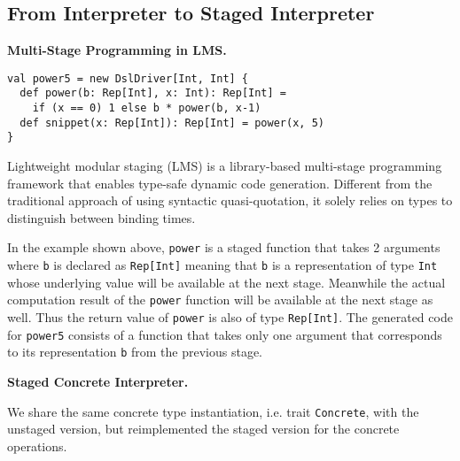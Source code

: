 \subsection{From Interpreter to Staged Interpreter} \label{stagedinterp}

\textbf{Multi-Stage Programming in LMS.}

\begin{lstlisting}
val power5 = new DslDriver[Int, Int] {
  def power(b: Rep[Int], x: Int): Rep[Int] =
    if (x == 0) 1 else b * power(b, x-1)
  def snippet(x: Rep[Int]): Rep[Int] = power(x, 5)
}
\end{lstlisting}

Lightweight modular staging (LMS)  is a library-based multi-stage programming framework 
that enables type-safe dynamic code generation. Different from the traditional approach of using
syntactic quasi-quotation, it solely relies on types to distinguish between binding times.

In the example shown above, \texttt{power} is a staged function that takes 2 arguments where 
\texttt{b} is declared as \texttt{Rep[Int]} meaning that \texttt{b} is a representation of type 
\texttt{Int} whose underlying value will be available at the next stage. Meanwhile the actual 
computation result of the \texttt{power} function  will be available at the next stage as well. 
Thus the return value of \texttt{power} is also of type \texttt{Rep[Int]}. The generated code for
\texttt{power5} consists of a function that takes only one argument that corresponds to its 
representation \texttt{b} from the previous stage.

\textbf{Staged Concrete Interpreter.} 

We share the same concrete type instantiation, i.e. trait \texttt{Concrete}, with the unstaged version,
but reimplemented the staged version for the concrete operations.

